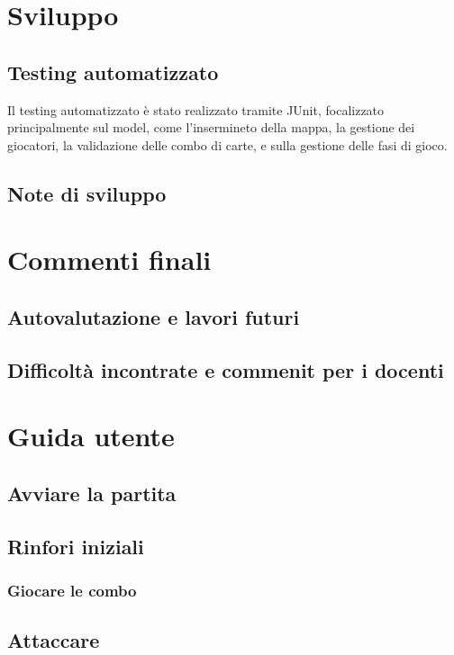 \documentclass[a4paper,12pt]{report}
\begin{document}
\chapter{Sviluppo}

\section{Testing automatizzato}
Il testing automatizzato è stato realizzato tramite JUnit, focalizzato principalmente sul model, come l'insermineto della mappa, la gestione dei giocatori, la validazione delle combo di carte, e sulla gestione delle fasi di gioco.

\section{Note di sviluppo}

\chapter{Commenti finali}

\section{Autovalutazione e lavori futuri}

\section{Difficoltà incontrate e commenit per i docenti}

\appendix
\chapter{Guida utente}
\section{Avviare la partita}
\section{Rinfori iniziali}
\subsection{Giocare le combo}
\section{Attaccare}
\end{document}
